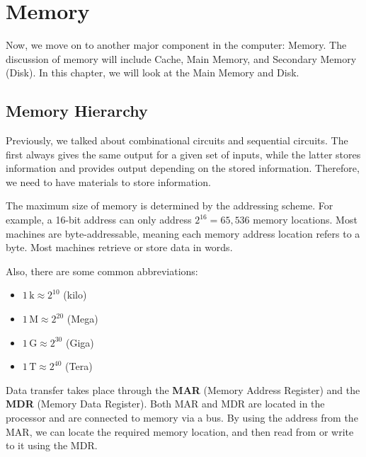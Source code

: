 \chapter{Memory}

Now, we move on to another major component in the computer: Memory. The discussion of memory will include Cache, Main Memory, and Secondary Memory (Disk). In this chapter, we will look at the Main Memory and Disk.

\section{Memory Hierarchy}
Previously, we talked about combinational circuits and sequential circuits. The first always gives the same output for a given set of inputs, while the latter stores information and provides output depending on the stored information. Therefore, we need to have materials to store information.

The maximum size of memory is determined by the addressing scheme. For example, a 16-bit address can only address \(2^{16} = 65,536\) memory locations. Most machines are byte-addressable, meaning each memory address location refers to a byte. Most machines retrieve or store data in words.

Also, there are some common abbreviations:
\begin{itemize}
  \item \(1\,\text{k} \approx 2^{10}\) (kilo)
  \item \(1\,\text{M} \approx 2^{20}\) (Mega)
  \item \(1\,\text{G} \approx 2^{30}\) (Giga)
  \item \(1\,\text{T} \approx 2^{40}\) (Tera)
\end{itemize}

Data transfer takes place through the \textbf{MAR} (Memory Address Register) and the \textbf{MDR} (Memory Data Register). Both MAR and MDR are located in the processor and are connected to memory via a bus. By using the address from the MAR, we can locate the required memory location, and then read from or write to it using the MDR.

